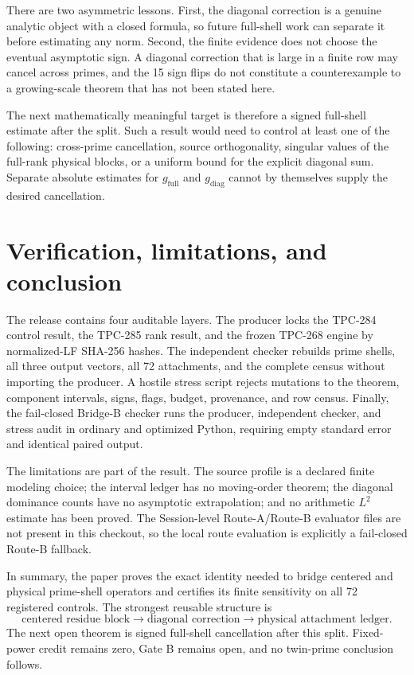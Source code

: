 \documentclass[11pt]{article}
\newcommand{\1}{\mathbf{1}}
\newcommand{\full}{\mathrm{full}}
\newcommand{\del}{\mathrm{diag}}
\begin{document}
There are two asymmetric lessons.  First, the diagonal correction is a
genuine analytic object with a closed formula, so future full-shell work can
separate it before estimating any norm.  Second, the finite evidence does not
choose the eventual asymptotic sign.  A diagonal correction that is large in a
finite row may cancel across primes, and the 15 sign flips do not constitute a
counterexample to a growing-scale theorem that has not been stated here.

The next mathematically meaningful target is therefore a signed full-shell
estimate after the split.  Such a result would need to control at least one of
the following: cross-prime cancellation, source orthogonality, singular values
of the full-rank physical blocks, or a uniform bound for the explicit diagonal
sum.  Separate absolute estimates for $g_{\full}$ and $g_{\del}$ cannot by
themselves supply the desired cancellation.

\section{Verification, limitations, and conclusion}

The release contains four auditable layers.  The producer locks the TPC-284
control result, the TPC-285 rank result, and the frozen TPC-268 engine by
normalized-LF SHA-256 hashes.  The independent checker rebuilds prime shells,
all three output vectors, all 72 attachments, and the complete census without
importing the producer.  A hostile stress script rejects mutations to the
theorem, component intervals, signs, flags, budget, provenance, and row
census.  Finally, the fail-closed Bridge-B checker runs the producer,
independent checker, and stress audit in ordinary and optimized Python,
requiring empty standard error and identical paired output.

The limitations are part of the result.  The source profile is a declared
finite modeling choice; the interval ledger has no moving-order theorem; the
diagonal dominance counts have no asymptotic extrapolation; and no arithmetic
$L^2$ estimate has been proved.  The Session-level Route-A/Route-B evaluator
files are not present in this checkout, so the local route evaluation is
explicitly a fail-closed Route-B fallback.

In summary, the paper proves the exact identity needed to bridge centered and
physical prime-shell operators and certifies its finite sensitivity on all 72
registered controls.  The strongest reusable structure is
\[
 \text{centered residue block}
 \longrightarrow \text{diagonal correction}
 \longrightarrow \text{physical attachment ledger}.
\]
The next open theorem is signed full-shell cancellation after this split.
Fixed-power credit remains zero, Gate B remains open, and no twin-prime
conclusion follows.
\end{document}
